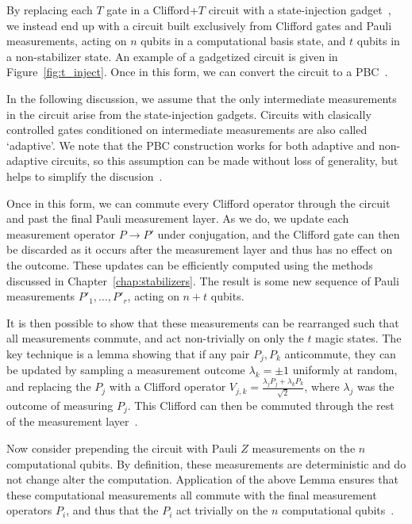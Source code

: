 By replacing each $T$ gate in a Clifford+$T$ circuit with a state-injection gadget~\cite{Bravyi2005}, we instead end up with a circuit built exclusively from Clifford gates and Pauli measurements, acting on $n$ qubits in a computational basis state, and $t$ qubits in a non-stabilizer state. An example of a gadgetized circuit is given in Figure~\ref{fig:t_inject}. Once in this form, we can convert the circuit to a PBC~\cite{Bravyi2015,Yoganathan2019}.\par
In the following discussion, we assume that the only intermediate measurements in the circuit arise from the state-injection gadgets. Circuits with clasically controlled gates conditioned on intermediate measurements are also called `adaptive'. We note that the PBC construction works for both adaptive and non-adaptive circuits, so this assumption can be made without loss of generality, but helps to simplify the discusion~\cite{Yoganathan2019,Bravyi2015}.\par
Once in this form, we can commute every Clifford operator through the circuit and past the final Pauli measurement layer. As we do, we update each measurement operator $P\rightarrow P'$ under conjugation, and the Clifford gate can then be discarded as it occurs after the measurement layer and thus has no effect on the outcome. These updates can be efficiently computed using the methods discussed in Chapter~\ref{chap:stabilizers}. The result is some new sequence of Pauli measurements $P'_{1},\dots,P'_{r}$, acting on $n+t$ qubits.\par
It is then possible to show that these measurements can be rearranged such that all measurements commute, and  act non-trivially on only the $t$ magic states. The key technique is a lemma showing that if any pair $P_{j},P_{k}$ anticommute, they can be updated by sampling a measurement outcome $\lambda_{k}=\pm1$ uniformly at random, and replacing the $P_{j}$ with a Clifford operator $V_{j,k}=\frac{\lambda_{j}P_{j}+\lambda_{k}P_{k}}{\sqrt{2}}$, where $\lambda_{j}$ was the outcome of measuring $P_{j}$. This Clifford can then be commuted through the rest of the measurement layer~\cite{Yoganathan2019}.\par
Now consider prepending the circuit with Pauli $Z$ measurements on the $n$ computational qubits. By definition, these measurements are deterministic and do not change alter the computation. Application of the above Lemma ensures that these computational measurements all commute with the final measurement operators $P_{i}$, and thus that the $P_{i}$ act trivially on the $n$ computational qubits~\cite{Bravyi2015}.\par
